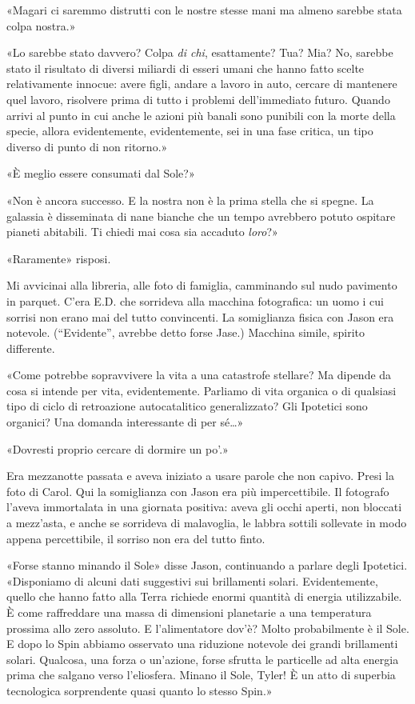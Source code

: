 «Magari ci saremmo distrutti con le nostre stesse mani ma almeno sarebbe
stata colpa nostra.»

«Lo sarebbe stato davvero? Colpa \emph{di chi}, esattamente? Tua? Mia?
No, sarebbe stato il risultato di diversi miliardi di esseri umani che
hanno fatto scelte relativamente innocue: avere figli, andare a lavoro
in auto, cercare di mantenere quel lavoro, risolvere prima di tutto i
problemi dell'immediato futuro. Quando arrivi al punto in cui anche le
azioni più banali sono punibili con la morte della specie, allora
evidentemente, evidentemente, sei in una fase critica, un tipo diverso
di punto di non ritorno.»

«È meglio essere consumati dal Sole?»

«Non è ancora successo. E la nostra non è la prima stella che si spegne.
La galassia è disseminata di nane bianche che un tempo avrebbero potuto
ospitare pianeti abitabili. Ti chiedi mai cosa sia accaduto
\emph{loro}?»

«Raramente» risposi.

Mi avvicinai alla libreria, alle foto di famiglia, camminando sul nudo
pavimento in parquet. C'era E.D. che sorrideva alla macchina
fotografica: un uomo i cui sorrisi non erano mai del tutto convincenti.
La somiglianza fisica con Jason era notevole. (``Evidente'', avrebbe
detto forse Jase.) Macchina simile, spirito differente.

«Come potrebbe sopravvivere la vita a una catastrofe stellare? Ma
dipende da cosa si intende per vita, evidentemente. Parliamo di vita
organica o di qualsiasi tipo di ciclo di retroazione autocatalitico
generalizzato? Gli Ipotetici sono organici? Una domanda interessante di
per sé\ldots»

«Dovresti proprio cercare di dormire un po'.»

Era mezzanotte passata e aveva iniziato a usare parole che non capivo.
Presi la foto di Carol. Qui la somiglianza con Jason era più
impercettibile. Il fotografo l'aveva immortalata in una giornata
positiva: aveva gli occhi aperti, non bloccati a mezz'asta, e anche se
sorrideva di malavoglia, le labbra sottili sollevate in modo appena
percettibile, il sorriso non era del tutto finto.

«Forse stanno minando il Sole» disse Jason, continuando a parlare degli
Ipotetici. «Disponiamo di alcuni dati suggestivi sui brillamenti solari.
Evidentemente, quello che hanno fatto alla Terra richiede enormi
quantità di energia utilizzabile. È come raffreddare una massa di
dimensioni planetarie a una temperatura prossima allo zero assoluto. E
l'alimentatore dov'è? Molto probabilmente è il Sole. E dopo lo Spin
abbiamo osservato una riduzione notevole dei grandi brillamenti solari.
Qualcosa, una forza o un'azione, forse sfrutta le particelle ad alta
energia prima che salgano verso l'eliosfera. Minano il Sole, Tyler! È un
atto di superbia tecnologica sorprendente quasi quanto lo stesso Spin.»

